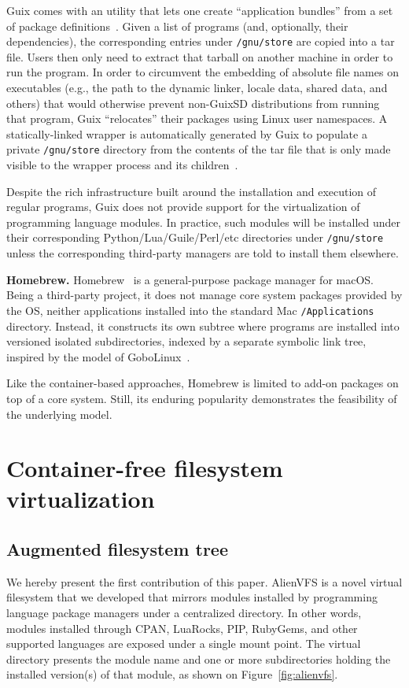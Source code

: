 \documentclass[sigplan, anonymous, 10pt]{acmart}
\begin{document}
Guix comes with an utility that lets one create ``application bundles'' from a set of package
definitions~\cite{gnu2017:bundles}. Given a list of programs (and, optionally, their dependencies),
the corresponding entries under \texttt{/gnu/store} are copied into a tar file. Users then only
need to extract that tarball on another machine in order to run the program. In order to circumvent
the embedding of absolute file names on executables (e.g., the path to the dynamic linker, locale
data, shared data, and others) that would otherwise prevent non-GuixSD distributions from running
that program, Guix ``relocates'' their packages using Linux user namespaces. A statically-linked
wrapper is automatically generated by Guix to populate a private \texttt{/gnu/store} directory
from the contents of the tar file that is only made visible to the wrapper process and its
children~\cite{gnu2018:tarballs}.

Despite the rich infrastructure built around the installation and execution of regular programs,
Guix does not provide support for the virtualization of programming language modules. In practice,
such modules will be installed under their corresponding Python/Lua/Guile/Perl/etc directories
under \texttt{/gnu/store} unless the corresponding third-party managers are told to install them
elsewhere.

\textbf{Homebrew.}
Homebrew~\cite{homebrew} is a general-purpose package manager for macOS. Being a third-party project,
it does not manage core system packages provided by the OS, neither applications installed
into the standard Mac \texttt{/Applications} directory. Instead, it constructs its own
subtree where programs are installed into versioned isolated subdirectories, indexed
by a separate symbolic link tree, inspired by the model of
GoboLinux~\cite{howell2009:homebrewgobo}.

Like the container-based approaches, Homebrew is limited to add-on packages on top of
a core system. Still, its enduring popularity demonstrates the feasibility of the
underlying model.

\section{Container-free filesystem virtualization}

\subsection{Augmented filesystem tree}
We hereby present the first contribution of this paper. AlienVFS is a novel virtual
filesystem that we developed that mirrors modules installed by programming language
package managers under a centralized directory. In other words, modules installed
through CPAN, LuaRocks, PIP, RubyGems, and other supported languages are exposed under
a single mount point. The virtual directory presents the module name and one or more
subdirectories holding the installed version(s) of that module, as shown on
Figure~\ref{fig:alienvfs}.
\end{document}
